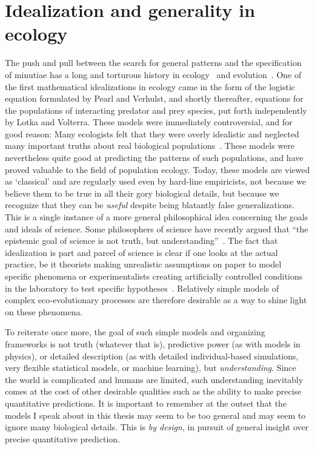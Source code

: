 \section{Idealization and generality in ecology}\label{idealization}
The push and pull between the search for general patterns and the specification of minutiae has a long and torturous history in ecology~\citep{kingsland_modeling_1985} and evolution~\citep{provine_origins_2001}. One of the first mathematical idealizations in ecology came in the form of the logistic equation formulated by Pearl and Verhulst, and shortly thereafter, equations for the populations of interacting predator and prey species, put forth independently by Lotka and Volterra. These models were immediately controversial, and for good reason: Many ecologists felt that they were overly idealistic and neglected many important truths about real biological populations~\citep{kingsland_modeling_1985}. These models were nevertheless quite good at predicting the patterns of such populations, and have proved valuable to the field of population ecology. Today, these models are viewed as `classical' and are regularly used even by hard-line empiricists, not because we believe them to be true in all their gory biological details, but because we recognize that they can be \emph{useful} despite being blatantly false generalizations. This is a single instance of a more general philosophical idea concerning the goals and ideals of science. Some philosophers of science have recently argued that ``the epistemic goal of science is not truth, but understanding''~\citep{potochnik_idealization_2018}. The fact that idealization is part and parcel of science is clear if one looks at the actual practice, be it theorists making unrealistic assumptions on paper to model specific phenomena or experimentalists creating artificially controlled conditions in the laboratory to test specific hypotheses~\citep{zuk_models_2018}. Relatively simple models of complex eco-evolutionary processes are therefore desirable as a way to shine light on these phenomena.

To reiterate once more, the goal of such simple models and organizing frameworks is not truth (whatever that is), predictive power (as with models in physics), or detailed description (as with detailed individual-based simulations, very flexible statistical models, or machine learning), but \emph{understanding}. Since the world is complicated and humans are limited, such understanding inevitably comes at the cost of other desirable qualities such as the ability to make precise quantitative predictions. It is important to remember at the outset that the models I speak about in this thesis may seem to be too general and may seem to ignore many biological details. This is \textit{by design}, in pursuit of general insight over precise quantitative prediction.

